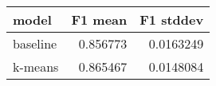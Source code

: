 \begin{tabular}{lrr}
\toprule
 model    &   F1 mean &   F1 stddev \\
\midrule
 baseline &  0.856773 &   0.0163249 \\
 k-means  &  0.865467 &   0.0148084 \\
\bottomrule
\end{tabular}